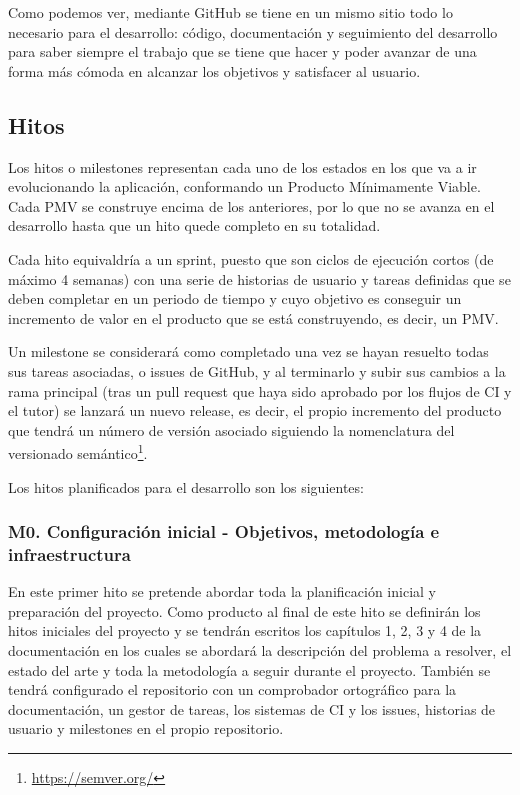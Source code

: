Como podemos ver, mediante GitHub se tiene en un mismo sitio todo lo necesario para el desarrollo: código, documentación y seguimiento del desarrollo para saber siempre el trabajo que se tiene que hacer y poder avanzar de una forma más cómoda en alcanzar los objetivos y satisfacer al usuario. 

\subsection{Hitos}
Los hitos o milestones representan cada uno de los estados en los que va a ir evolucionando la aplicación, conformando un Producto Mínimamente Viable. Cada PMV se construye encima de los anteriores, por lo que no se avanza en el desarrollo hasta que un hito quede completo en su totalidad. 

Cada hito equivaldría a un sprint, puesto que son ciclos de ejecución cortos (de máximo 4 semanas) con una serie de historias de usuario y tareas definidas que se deben completar en un periodo de tiempo y cuyo objetivo es conseguir un incremento de valor en el producto que se está construyendo, es decir, un PMV.

Un milestone se considerará como completado una vez se hayan resuelto todas sus tareas asociadas, o issues de GitHub, y al terminarlo y subir sus cambios a la rama principal (tras un pull request que haya sido aprobado por los flujos de CI y el tutor) se lanzará un nuevo release, es decir, el propio incremento del producto que tendrá un número de versión asociado siguiendo la nomenclatura del versionado semántico\footnote{\url{https://semver.org/}}.

Los hitos planificados para el desarrollo son los siguientes:

\subsubsection{M0. Configuración inicial - Objetivos, metodología e infraestructura}
En este primer hito se pretende abordar toda la planificación inicial y preparación del proyecto. Como producto al final de este hito se definirán los hitos iniciales del proyecto y se tendrán escritos los capítulos 1, 2, 3 y 4 de la documentación en los cuales se abordará la descripción del problema a resolver, el estado del arte y toda la metodología a seguir durante el proyecto. También se tendrá configurado el repositorio con un comprobador ortográfico para la documentación, un gestor de tareas, los sistemas de CI y los issues, historias de usuario y milestones en el propio repositorio.\\

